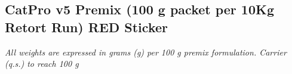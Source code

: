
\subsection*{CatPro v5 Premix (100 g packet per 10Kg Retort Run) RED Sticker}
\vspace{0.5em}
\noindent\textit{All weights are expressed in grams (g) per 100 g premix formulation. Carrier (q.s.) to reach 100 g}
\vspace{0.5em}


